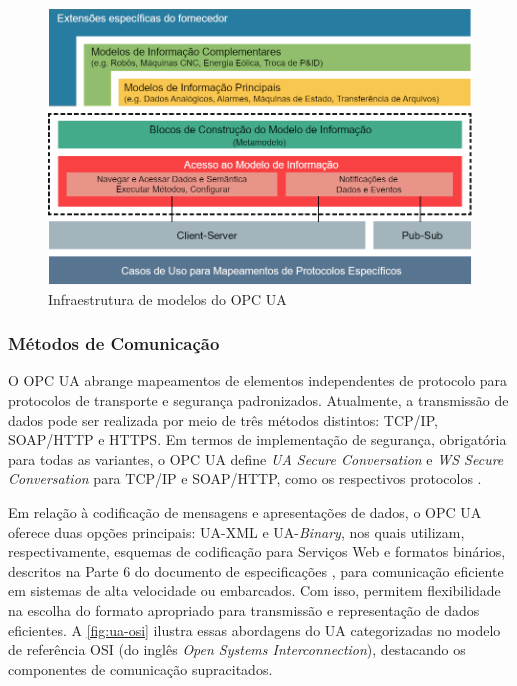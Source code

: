         \begin{figure}[htbp]
            \caption{Infraestrutura de modelos do OPC UA}
            \label{fig:opcuaArq}
            \begin{center}
                \includegraphics[width=0.9\linewidth]{USPSC-img/opcuaArq.png}
            \end{center}
        \end{figure}

        \subsubsection{Métodos de Comunicação}

        O OPC UA abrange mapeamentos de elementos independentes de protocolo para protocolos de transporte e segurança padronizados. Atualmente, a transmissão de dados pode ser realizada por meio de três métodos distintos: TCP/IP, SOAP/HTTP e HTTPS. Em termos de implementação de segurança, obrigatória para todas as variantes, o OPC UA define \textit{UA Secure Conversation} e \textit{WS Secure Conversation} para TCP/IP e SOAP/HTTP, como os respectivos protocolos  \cite{neumann2015}.
        
        Em relação à codificação de mensagens e apresentações de dados, o OPC UA oferece duas opções principais: UA-XML e UA-\textit{Binary}, nos quais utilizam, respectivamente, esquemas de codificação para Serviços Web e formatos binários, descritos na Parte 6 do documento de especificações \cite{opc2022}, para comunicação eficiente em sistemas de alta velocidade ou embarcados. Com isso, permitem flexibilidade na escolha do formato apropriado para transmissão e representação de dados eficientes. A \autoref{fig:ua-osi} ilustra essas abordagens do UA categorizadas no modelo de referência OSI (do inglês \textit{Open Systems Interconnection}), destacando os componentes de comunicação supracitados. %
        
